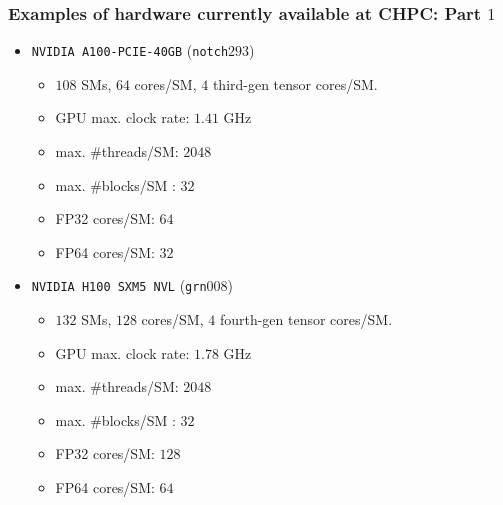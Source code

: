 \begin{frame}
	\frametitle{Examples of hardware currently available at CHPC: Part $1$}
   \begin{itemize}
	   \item \texttt{NVIDIA A100-PCIE-40GB} (\texttt{notch}$293$)  %
         \begin{itemize}
            \item $108$ SMs, $64$ cores/SM, $4$ third-gen tensor cores/SM.
            \item GPU max. clock rate: $1.41$ GHz
            \item max. \#threads/SM: $2048$ 
            \item max. \#blocks/SM : $32$
            \item FP32 cores/SM: $64$
            \item FP64 cores/SM: $32$
         \end{itemize}	

 \item \texttt{NVIDIA H100 SXM5 NVL} (\texttt{grn}$008$) 
         \begin{itemize}
            \item $132$ SMs, $128$ cores/SM, $4$ fourth-gen tensor cores/SM.
            \item GPU max. clock rate: $1.78$ GHz
            \item max. \#threads/SM: $2048$
            \item max. \#blocks/SM : $32$
            \item FP32 cores/SM: $128$
            \item FP64 cores/SM: $64$
         \end{itemize}
   \end{itemize}
\end{frame}	


